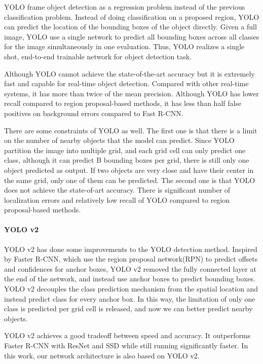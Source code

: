 YOLO  frame object detection as a regression problem instead of the previous classification problem. Instead of doing classification on a proposed region, YOLO can predict the location of the bounding boxes of the object directly. Given a full image, YOLO use a single network to predict all bounding boxes across all classes for the image simultaneously in one evaluation. Thus, YOLO realizes a single shot, end-to-end trainable network for object detection task.

Although YOLO cannot achieve the state-of-the-art accuracy but it is extremely fast and capable for real-time object detection. Compared with other real-time systems, it has more than twice of the mean precision. Although YOLO has lower recall compared to region proposal-based methods, it has less than half false positives on background errors compared to Fast R-CNN.

There are some constraints of YOLO as well. The first one is that there is a limit on the number of nearby objects that the model can predict. Since YOLO partition the image into multiple grid, and each grid cell can only predict one class, although it can predict B bounding boxes per grid, there is still only one object predicted as output. If two objects are very close and have their center in the same grid, only one of them can be predicted. The second one is that YOLO does not achieve the state-of-art accuracy. There is significant number of localization errors and relatively low recall of YOLO compared to region proposal-based methods.

\paragraph{YOLO v2}
YOLO v2 has done some improvements to the YOLO detection method. Inspired by Faster R-CNN, which use the region proposal network(RPN) to predict offsets and confidences for anchor boxes, YOLO v2 removed the fully connected layer at the end of the network, and instead use anchor boxes to predict bounding boxes. YOLO v2 decouples the class prediction mechanism from the spatial location and instead predict class for every anchor box. In this way, the limitation of only one class is predicted per grid cell is released, and now we can better predict nearby objects.

YOLO v2 achieves a good tradeoff between speed and accuracy. It outperforms Faster R-CNN with ResNet and SSD while still running significantly faster. In this work, our network architecture is also based on YOLO v2.


